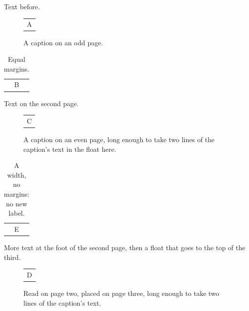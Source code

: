 \documentclass[twoside]{article}
\begin{document}
Text before.
\begin{figure}[h]
\centering
\begin{tabular}{c}A\end{tabular}
\caption{A caption on an odd page.}
\end{figure}
\begin{table}[h]
\captionsetup{margin=10pt}
\caption{Equal margins.}
\centering
\begin{tabular}{c}B\end{tabular}
\end{table}
\clearpage
Text on the second page.
\begin{figure}[h]
\centering
\begin{tabular}{c}C\end{tabular}
\caption{A caption on an even page, long enough to take two lines of the caption's text in the float here.}
\end{figure}
\begin{table}[h]
\captionsetup{width=6cm}
\caption{A width, no margins: no new label.}
\centering
\begin{tabular}{c}E\end{tabular}
\end{table}
\vspace*{12cm}
More text at the foot of the second page, then a float that goes to the top of the third.
\begin{figure}[t]
\centering
\begin{tabular}{c}D\end{tabular}
\caption{Read on page two, placed on page three, long enough to take two lines of the caption's text.}
\end{figure}
\end{document}
